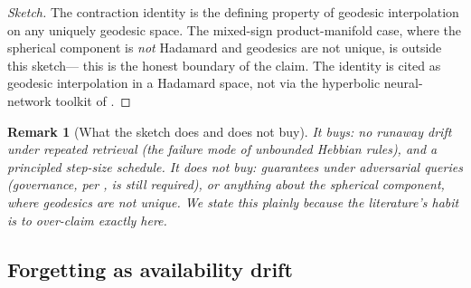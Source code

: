 \documentclass[11pt,a4paper]{article}
\newtheorem{remark}{Remark}
\begin{document}
\begin{proof}[Sketch]
The contraction identity is the defining property of geodesic
interpolation on any uniquely geodesic space. The mixed-sign
product-manifold case, where the spherical component is \emph{not}
Hadamard and geodesics are not unique, is outside this sketch---
this is the honest boundary of the claim. The identity is cited as
geodesic interpolation in a Hadamard space, not via the hyperbolic
neural-network toolkit of \cite{ganea2018}.
\end{proof}

\begin{remark}[What the sketch does and does not buy]
It buys: no runaway drift under repeated retrieval (the failure mode of
unbounded Hebbian rules), and a principled step-size schedule. It does
not buy: guarantees under adversarial queries (governance, per
\cite{epistemics}, is still required), or anything about the spherical
component, where geodesics are not unique. We state this plainly because
the literature's habit is to over-claim exactly here.
\end{remark}

\subsection{Forgetting as availability drift}
\label{sec:forgetting}
\end{document}
